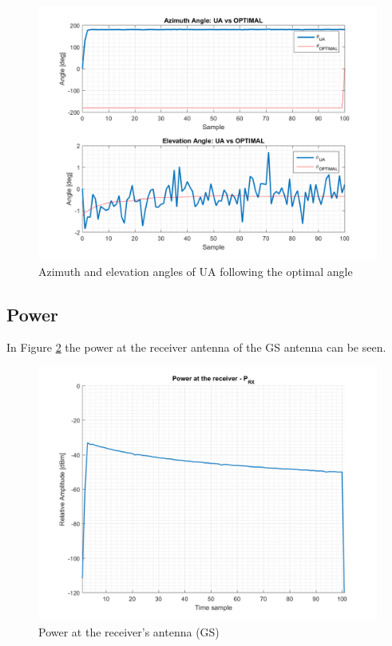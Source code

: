 \begin{figure}[H]
	\centering
	\includegraphics[scale=0.75]{figures/s2_ua.png}
	\caption{Azimuth and elevation angles of UA following the optimal angle}
	\label{fig:s2_ua}
\end{figure}


\subsection{Power}
In Figure \ref{fig:s2_power} the power at the receiver antenna of the GS antenna can be seen.

\begin{figure}[H]
	\centering
	\includegraphics[scale=0.75]{figures/s2_power.png}
	\caption{Power at the receiver's antenna (GS)}
	\label{fig:s2_power}
\end{figure}

